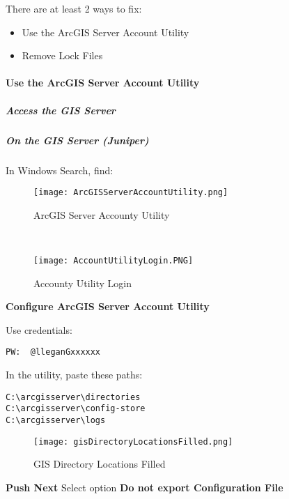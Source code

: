 \documentclass[class=book , crop=false, titlepage, twoside, multi={itemize, figure, verbatim}, float=false]{standalone}
\begin{document}
\noindent There are at least 2 ways to fix:
\begin{itemize}
\item Use the ArcGIS Server Account Utility
\item Remove Lock Files
\end{itemize}
\paragraph[Use the ArcGIS Server Account Utility]{Use the ArcGIS Server Account Utility\texorpdfstring{\\}{}}
\subparagraph*{Access the GIS Server\texorpdfstring{\\}{}}
\vspace{.25in}

\vspace{.25in}

\vspace{.25in}

\clearpage
\subparagraph*{On the GIS Server (Juniper)\texorpdfstring{\\}{}}
\noindent In Windows Search, find:
\vspace{.1in}

\begin{wrapfigure}{r}{0.5\textwidth}
\centering
\texttt{[image: ArcGISServerAccountUtility.png]}
\caption{ArcGIS Server Accounty Utility}
\vspace{.25in}
\HRule \\[.4cm] %
\vspace{.25in}

\texttt{[image: AccountUtilityLogin.PNG]}
\caption{Accounty Utility Login}
\end{wrapfigure}
\noindent \textbf{Configure ArcGIS Server Account Utility}
\vspace{4in}

\noindent Use credentials:
\vspace{.35in}

\begin{verbatim}
PW:  @lleganGxxxxxx
\end{verbatim}
\clearpage
\noindent In the utility, paste these paths:
\begin{verbatim}
C:\arcgisserver\directories
C:\arcgisserver\config-store
C:\arcgisserver\logs
\end{verbatim}
\begin{figure}[h!]
\centering
\texttt{[image: gisDirectoryLocationsFilled.png]}
\caption{GIS Directory Locations Filled}
\end{figure}
\noindent\textbf{\Large Push Next}
\clearpage
\noindent Select option \textbf{Do not export Configuration File}
\end{document}

